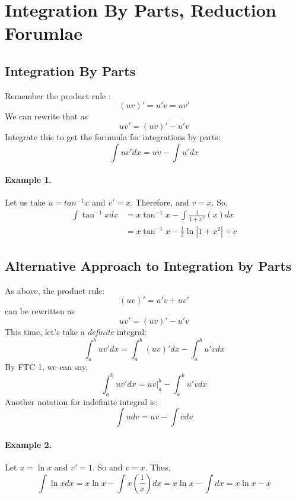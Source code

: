 

\chapter{Integration By Parts, Reduction Forumlae}
\bigbreak

\section{Integration By Parts}

Remember the product rule : $$(uv)' = u'v = uv'$$
We can rewrite that as $$uv' = (uv)' - u'v$$
Integrate this to get the forumula for integrations by parts:
$$ \int uv' dx = uv - \int u' dx $$

\subsubsection{Example 1.  }

Let us take $u = tan^{-1}x$ and $v' = x$.
Therefore,  and $v = x$.
So,
\begin{align*}
\int \tan^{-1} x dx & = x \tan^{-1} x - \int \frac{1}{1+x^2} (x) dx \\
    & = x \tan^{-1} x - \frac{1}{2} \ln |1+x^2| + c
\end{align*}


\section{Alternative Approach to Integration by Parts}

As above, the product rule: $$(uv)' = u'v + uv'$$
can be rewritten as $$uv' = (uv)' - u'v$$
This time, let's take a {\it definite} integral:
$$ \int_a^b uv' dx = \int_a^b (uv)' dx - \int_a^b u'v dx $$
By FTC 1, we can say,
$$ \int_a^b uv' dx = uv \Big|_a^b - \int_a^b u'v dx $$
Another notation for indefinite integral is:
$$ \int u dv = uv - \int v du $$

\subsubsection{Example 2. }
Let $u = \ln x$ and $v' = 1$. So  and $v = x$.
Thus,
$$ \int \ln x dx = x \ln x - \int x \left( \frac{1}{x} \right) dx = x \ln x - \int dx = x \ln x - x$$


